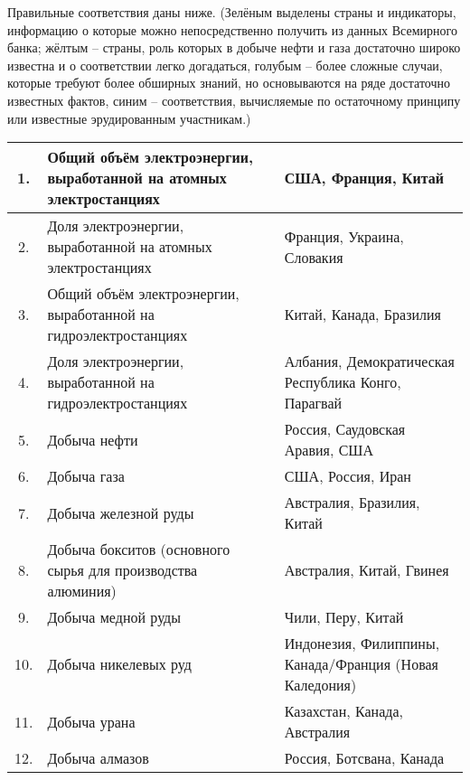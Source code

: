 Правильные соответствия даны ниже. (Зелёным выделены страны и индикаторы, информацию о которые можно непосредственно получить из данных Всемирного банка; жёлтым – страны, роль которых в добыче нефти и газа достаточно широко известна и о соответствии легко догадаться, голубым – более сложные случаи, которые требуют более обширных знаний, но основываются на ряде достаточно известных фактов, синим – соответствия, вычисляемые по остаточному принципу или известные эрудированным участникам.)

\begin{longtable}{|c|p{8cm}|p{4cm}|}
    \hline
    \rowcolor{green} 1. & Общий объём электроэнергии, выработанной на атомных электростанциях & США, Франция, Китай \\
    \hline
    \rowcolor{green} 2. & Доля электроэнергии, выработанной на атомных электростанциях & Франция, Украина, Словакия \\
    \hline
    \rowcolor{green} 3. & Общий объём электроэнергии, выработанной на гидроэлектростанциях & Китай, Канада, Бразилия \\
    \hline
    \rowcolor{green} 4. & Доля электроэнергии, выработанной на гидроэлектростанциях & Албания, Демократическая Республика Конго, Парагвай \\
    \hline
    \rowcolor{yellow} 5. & Добыча нефти & Россия, Саудовская Аравия, США \\
    \hline
    \rowcolor{yellow} 6. &Добыча газа & США, Россия, Иран \\
    \hline 
    \rowcolor{blue} 7. & Добыча железной руды & Австралия, Бразилия, Китай \\
    \hline
    \rowcolor{blue} 8. & Добыча бокситов (основного сырья для производства алюминия) & Австралия, Китай, Гвинея \\
    \hline
    \rowcolor{cyan} 9. & Добыча медной руды & Чили, Перу, Китай \\
    \hline
    \rowcolor{blue} 10. & Добыча никелевых руд & Индонезия, Филиппины, Канада/Франция (Новая Каледония) \\
    \hline
    \rowcolor{cyan} 11. & Добыча урана & Казахстан, Канада, Австралия \\
    \hline
    \rowcolor{cyan} 12. & Добыча алмазов & Россия, Ботсвана, Канада \\
    \hline
\end{longtable}

